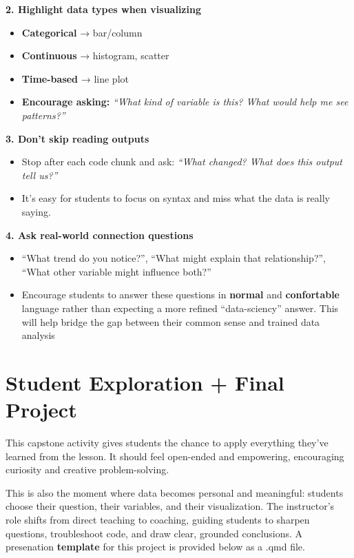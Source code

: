 \documentclass[
]{article}
\begin{document}
\textbf{2. Highlight data types when visualizing}

\begin{itemize}
\item
  \textbf{Categorical} → bar/column
\item
  \textbf{Continuous} → histogram, scatter
\item
  \textbf{Time-based} → line plot
\item
  \textbf{Encourage asking:} \emph{``What kind of variable is this? What
  would help me see patterns?''}
\end{itemize}

\textbf{3. Don't skip reading outputs}

\begin{itemize}
\item
  Stop after each code chunk and ask: \emph{``What changed? What does
  this output tell us?''}
\item
  It's easy for students to focus on syntax and miss what the data is
  really saying.
\end{itemize}

\textbf{4. Ask real-world connection questions}

\begin{itemize}
\item
  ``What trend do you notice?'', ``What might explain that
  relationship?'', ``What other variable might influence both?''
\item
  Encourage students to answer these questions in \textbf{normal} and
  \textbf{confortable} language rather than expecting a more refined
  ``data-sciency'' answer. This will help bridge the gap between their
  common sense and trained data analysis
\end{itemize}

\section{Student Exploration + Final
Project}\label{student-exploration-final-project}

This capstone activity gives students the chance to apply everything
they've learned from the lesson. It should feel open-ended and
empowering, encouraging curiosity and creative problem-solving.

This is also the moment where data becomes personal and meaningful:
students choose their question, their variables, and their
visualization. The instructor's role shifts from direct teaching to
coaching, guiding students to sharpen questions, troubleshoot code, and
draw clear, grounded conclusions. A presenation \textbf{template} for
this project is provided below as a .qmd file.
\end{document}
